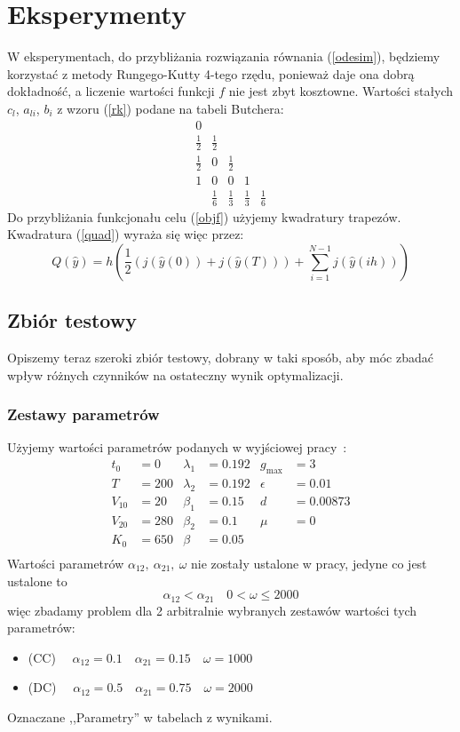 \documentclass[11pt]{article}
\begin{document}
\section{Eksperymenty}
W eksperymentach, do przybliżania rozwiązania równania (\ref{odesim}), będziemy korzystać z metody Rungego-Kutty 4-tego rzędu, ponieważ daje ona dobrą dokładność, a liczenie wartości funkcji $f$ nie jest zbyt kosztowne. Wartości stałych $c_l$, $a_{li}$, $b_i$ z wzoru (\ref{rk}) podane na tabeli Butchera:
\begin{equation}\label{butcher}
  \begin{array}
    {c|cccc}
    0\\
    \frac{1}{2} & \frac{1}{2}\\
    \frac{1}{2} &0 &\frac{1}{2} \\
    1& 0& 0& 1\\
    \hline{}
    & \frac{1}{6} &\frac{1}{3} &\frac{1}{3} &\frac{1}{6} 
  \end{array}
\end{equation}
Do przybliżania funkcjonału celu (\ref{objf}) użyjemy kwadratury trapezów. Kwadratura (\ref{quad}) wyraża się więc przez:
\begin{equation} \label{trapezoidal}
  Q(\hat{y}) = h\left(\frac{1}{2}(j(\hat{y}(0)) + j(\hat{y}(T))) + \sum_{i=1}^{N-1} j(\hat{y}(ih))\right)
\end{equation}

\subsection{Zbiór testowy}
Opiszemy teraz szeroki zbiór testowy, dobrany w taki sposób, aby móc zbadać wpływ różnych czynników na ostateczny wynik optymalizacji.
\subsubsection{Zestawy parametrów}
Użyjemy wartości parametrów podanych w wyjściowej pracy~\cite{BBF-manuscript}:
\begin{align*}
  t_0 &= 0          & \lambda_1 &= 0.192 & g_{\max} &= 3    \\
  T &= 200          & \lambda_2 &= 0.192 & \epsilon &= 0.01 \\
  V_{10} &= 20      & \beta_1 &= 0.15    & d &= 0.00873     \\
  V_{20} &= 280     & \beta_2 &= 0.1     & \mu &= 0         \\
  K_0 &= 650        & \beta &= 0.05      &       &          \\
\end{align*}
Wartości parametrów $\alpha_{12},\ \alpha_{21},\ \omega$ nie zostały ustalone w pracy, jedyne co jest ustalone to
\[ \alpha_{12} < \alpha_{21}\quad 0 < \omega \le 2000 \]
więc zbadamy problem dla 2 arbitralnie wybranych zestawów wartości tych parametrów:
\begin{itemize}
\item{(CC)} $\quad \alpha_{12} = 0.1 \quad \alpha_{21} = 0.15 \quad \omega = 1000$
\item{(DC)} $\quad \alpha_{12} = 0.5 \quad \alpha_{21} = 0.75 \quad \omega = 2000$ 
\end{itemize}
Oznaczane ,,Parametry'' w tabelach z wynikami.
\end{document}
